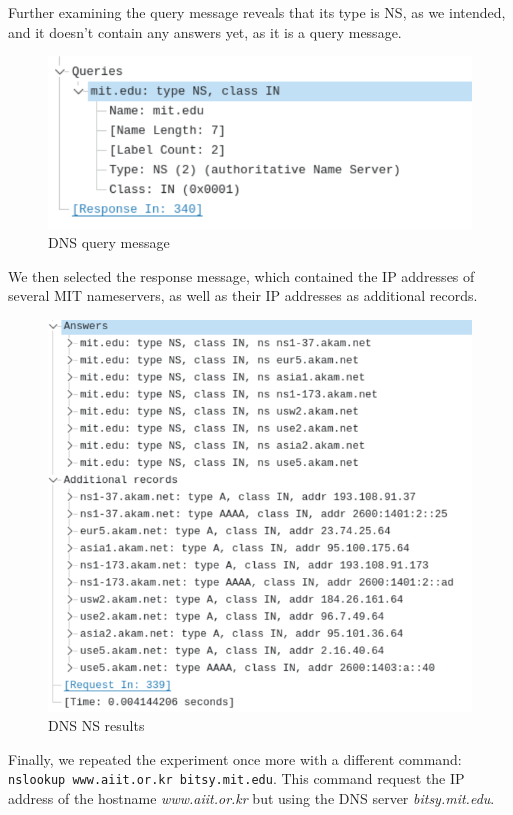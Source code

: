 Further examining the query message reveals that its type is NS, as we
intended, and it doesn't contain any answers yet, as it is a query message.

\begin{figure}[htbp]
    \centering
    \includegraphics[width=1\linewidth]{img/20.png}
    \caption{DNS query message}\label{fig:20}
\end{figure}

We then selected the response message, which contained the IP addresses of
several MIT nameservers, as well as their IP addresses as additional records.

\begin{figure}[htbp]
    \centering
    \includegraphics[width=1\linewidth]{img/21.png}
    \caption{DNS NS results}\label{fig:21}
\end{figure}

Finally, we repeated the experiment once more with a different command:
\texttt{nslookup www.aiit.or.kr bitsy.mit.edu}. This command request the IP
address of the hostname \textit{www.aiit.or.kr} but using the DNS server
\textit{bitsy.mit.edu}.

